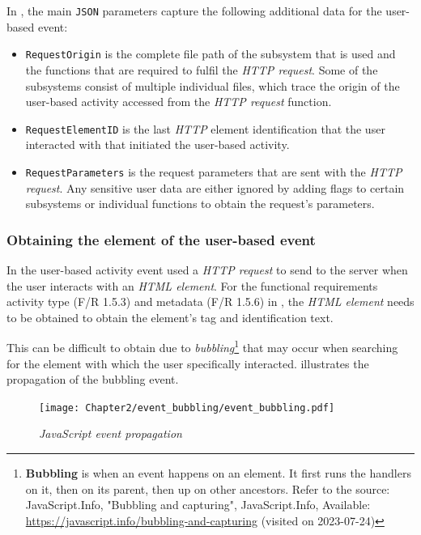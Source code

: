 In , the main \texttt{JSON} parameters capture the following additional data for the user-based event:

\begin{itemize}
	\item \texttt{RequestOrigin} is the complete file path of the subsystem that is used and the functions that are required to fulfil the \textit{HTTP request}. Some of the subsystems consist of multiple individual files, which trace the origin of the user-based activity accessed from the \textit{HTTP request} function.
	\item \texttt{RequestElementID} is the last \textit{HTTP} element identification that the user interacted with that initiated the user-based activity.
	\item \texttt{RequestParameters} is the request parameters that are sent with the \textit{HTTP request}. Any sensitive user data are either ignored by adding flags to certain subsystems or individual functions to obtain the request's parameters.
\end{itemize}

\subsubsection{Obtaining the element of the user-based event}\label{sec:ch3_ElementObtaining}
In  the user-based activity event used a \textit{HTTP request} to send to the server when the user interacts with an \textit{HTML element}. For the functional requirements activity type (F/R 1.5.3) and metadata (F/R 1.5.6) in , the \textit{HTML element} needs to be obtained to obtain the element's tag and identification text.

\clearpage

This can be difficult to obtain due to \textit{bubbling}\footnote{\textbf{Bubbling} is when an event happens on an element. It first runs the handlers on it, then on its parent, then up on other ancestors. Refer to the source: JavaScript.Info, "Bubbling and capturing", JavaScript.Info, Available: \url{https://javascript.info/bubbling-and-capturing} (visited on 2023-07-24)} that may occur when searching for the element with which the user specifically interacted.  illustrates the propagation of the bubbling event.

\begin{figure}[!htb]
	\centering %
	\texttt{[image: Chapter2/event\_bubbling/event\_bubbling.pdf]}
	\caption[JavaScript event propagation]
	{\textit{JavaScript event propagation}}\label{fig:ch2_event_bubbling}
\end{figure}

